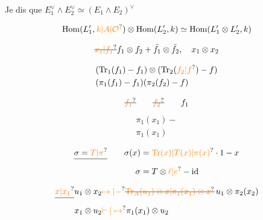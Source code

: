 Je dis que \quad $E_1^\vee\wedge E_2^\vee\simeq(E_1\wedge E_2)^\vee$

\[
\mathrm{Hom}(L'_1,\unsure{k|A|\mathcal O})\otimes\mathrm{Hom}(L'_2,k)\simeq\mathrm{Hom}(L'_1\otimes L'_2,k)
\]

\[
\deleted{\unsure{x_1|f_1}}f_1\otimes f_2+\bar f_1\otimes\bar f_2,\quad x_1\otimes x_2
\]


\[
\begin{aligned}
&(\mathrm{Tr}_1(f_1)-f_1)\otimes(\mathrm{Tr}_2(\unsure{f_2|f})-f)\\
&(\pi_1(f_1)-f_1)(\pi_2(f_2)-f)
\end{aligned}
\]

\[
\deleted{\unsure{f_1}}\qquad\deleted{\unsure{f_2}}\qquad f_1
\]
\[
\begin{aligned}\pi_1(x_1)-\\ \pi_1(x_1)\end{aligned}
\]

\[
\begin{aligned}
\deleted{\sigma=\unsure{T|\pi}}\qquad \sigma(x)&=\unsure{\mathrm{Tr}(x)|T(x)|\pi(x)}\cdot1-x\\
\sigma&=T\otimes\unsure{\ell|e}-\mathrm{id}
\end{aligned}
\]


\[
\begin{aligned}
\deleted{\unsure{x|x_1}}u_1\otimes x_2&\unsure{\mapsto|\mathbin{-}}\deleted{\unsure{\mathrm{Tr}_{A}(u_1)\otimes x|\pi_1(x_1)\otimes x}}\,u_1\otimes\pi_2(x_2)\\
x_1\otimes u_2&\unsure{\mathrel{\vdash}|\mapsto}\pi_1(x_1)\otimes u_2
\end{aligned}
\]

